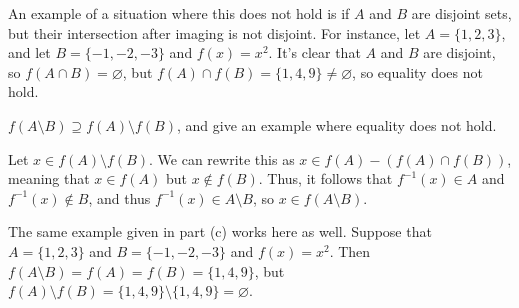 \documentclass[11pt]{article}
\begin{document}
\begin{Parts}
\begin{solution}
        An example of a situation where this does not hold is if $A$ and $B$ are disjoint sets, but their intersection after imaging is not disjoint. For instance, let $A = \{1, 2, 3\}$, and let $B = \{-1, -2, -3\}$ and $f(x) = x^2$. It's clear that $A$ and $B$ are disjoint, so $f(A \cap B) = \varnothing$, but $f(A) \cap f(B) = \{1, 4, 9\} \neq \varnothing$, so equality does not hold.
    \end{solution}
    \Part $f(A \setminus B) \supseteq f(A) \setminus f(B)$, and give an example where equality does not hold.

    \begin{solution}
        Let $x \in f(A) \setminus f(B)$. We can rewrite this as $x \in f(A) - (f(A) \cap f(B))$, meaning that $x \in f(A)$ but $x \notin f(B)$. Thus, it follows that $f^{-1}(x) \in A$ and $f^{-1}(x) \notin B$, and thus $f^{-1}(x) \in A \setminus B$, so $x \in f(A \setminus B)$. 


        The same example given in part (c) works here as well. Suppose that $A = \{ 1, 2, 3\}$ and $B = \{-1, -2, -3\}$ and $f(x) = x^2$. Then $f(A \setminus B) = f(A) = f(B) = \{1, 4, 9\}$, but $f(A) \setminus f(B) = \{1, 4, 9\} \setminus \{1, 4, 9\} = \varnothing$.



        
    \end{solution}
\end{Parts}
\end{document}

